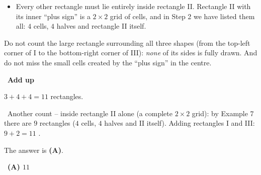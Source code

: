 \documentclass[11pt]{article}
\providecommand{\AnsWord}{Đáp số}
\newcommand{\ans}[1]{\par\smallskip{\bfseries\color{tmGreen!88!black}\AnsWord:}\ {\bfseries\color{AnsRed}#1}\par}
\newcommand{\step}[2]{\par\smallskip\noindent{\bfseries\color{tmBlue!85!black}\StepWord~#1.}\ {\bfseries #2}\par\nopagebreak}
\newcommand{\verify}[1]{\par\smallskip\noindent{\bfseries\color{tmGreen!80!black}\faCheckCircle\ \CheckWord}\ #1\par}
\def\AnsWord{Answer}
\def\StepWord{Step}
\def\CheckWord{Check:}
\begin{document}
{\begin{itemize}[leftmargin=1.2em,itemsep=1pt,topsep=1pt]
\item Every other rectangle must lie entirely inside rectangle II. Rectangle II with its inner ``plus sign'' is a $2\times2$ grid of cells, and in Step 2 we have listed them all: $4$ cells, $4$ halves and rectangle II itself.
\end{itemize}
\begin{warnbox}Do not count the large rectangle surrounding all three shapes (from the top-left corner of I to the bottom-right corner of III): \emph{none} of its sides is fully drawn. And do not miss the small cells created by the ``plus sign'' in the centre.\end{warnbox}
\step{4}{Add up}
$3+4+4=11$ rectangles.
\verify{Another count -- inside rectangle II alone (a complete $2\times2$ grid): by Example 7 there are $9$ rectangles ($4$ cells, $4$ halves and II itself). Adding rectangles I and III: $9+2=11$ \checkmark.}
The answer is \textbf{(A)}.
\ans{(A) $11$}
}

\providecommand{\cpTooth}[3]{%
  \foreach \j in {0,...,#1}{\foreach \i in {1,...,#2}{
    \draw[tmOrange!85!black,line width=1.6pt,line cap=round]
      ({(\i-1)*#3+0.05},{\j*#3})--({\i*#3-0.05},{\j*#3});}}
  \foreach \j in {1,...,#1}{\foreach \i in {0,...,#2}{
    \draw[tmOrange!85!black,line width=1.6pt,line cap=round]
      ({\i*#3},{(\j-1)*#3+0.05})--({\i*#3},{\j*#3-0.05});}}}
\end{document}
